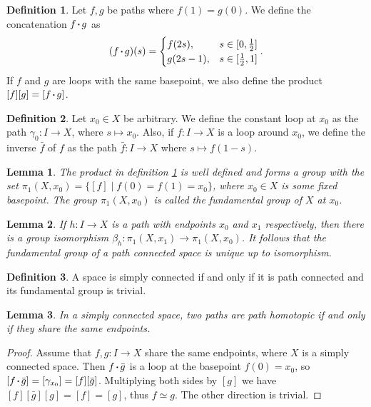 \documentclass{report}
\newtheorem{lemma}{Lemma}[section]
\theoremstyle{definition}
\newtheorem{definition}{Definition}[section]
\theoremstyle{remark}
\newcommand{\set}[1]{\{#1\}}
\newcommand*\concat{\mathbin{\vcenter{\hbox{\rule{.3ex}{.3ex}}}}}
\begin{document}
\begin{definition} \label{def_concatpaths}
   Let $f, g$ be paths where $f(1)=g(0)$. We define the concatenation $f \concat g$ as 
   \begin{equation*}
       (f \concat g)(s) = \begin{cases}
       f(2s), & s \in [0, \frac{1}{2}] \\
       g(2s-1), & s \in [\frac{1}{2}, 1] \\
       \end{cases}.
   \end{equation*} If $f$ and $g$ are loops with the same basepoint, we also define the product $[f][g] = [f \concat g]$.
\end{definition}

\begin{definition}
   Let $x_0 \in X$ be arbitrary. We define the constant loop at $x_0$ as the path $\gamma_0 : I \to X$, where $s \mapsto x_0$. Also, if $f: I \to X$ is a loop around $x_0$, we define the inverse $\bar{f}$ of $f$ as the path $\bar{f} : I \to X$ where $s \mapsto f(1-s)$. 
\end{definition}

\begin{lemma}
    The product in definition \ref{def_concatpaths} is well defined and forms a group with the set $\pi_1(X, x_0) = \set{[f] \mid f(0) = f(1) = x_0}$, where $x_0 \in X$ is some fixed basepoint. The group $\pi_1(X, x_0)$ is called the fundamental group of $X$ at $x_0$.
\end{lemma}

\begin{lemma}
    If $h : I \to X$ is a path with endpoints $x_0$ and $x_1$ respectively, then there is a group isomorphism $\beta_h : \pi_1(X, x_1) \to \pi_1(X, x_0)$. It follows that the fundamental group of a path connected space is unique up to isomorphism.
\end{lemma}

\begin{definition}
   A space is simply connected if and only if it is path connected and its fundamental group is trivial.
\end{definition}

\begin{lemma}
    In a simply connected space, two paths are path homotopic if and only if they share the same endpoints.
\end{lemma}

\begin{proof}
    Assume that $f, g : I \to X$ share the same endpoints, where $X$ is a simply connected space. Then $f \concat \bar{g}$ is a loop at the basepoint $f(0) = x_0$, so $[f \concat \bar{g}] = [\gamma_{x_0}] = [f][\bar{g}]$. Multiplying both sides by $[g]$ we have $[f][\bar{g}][g] = [f] = [g]$, thus $f \simeq g$. The other direction is trivial.
\end{proof}
\end{document}
